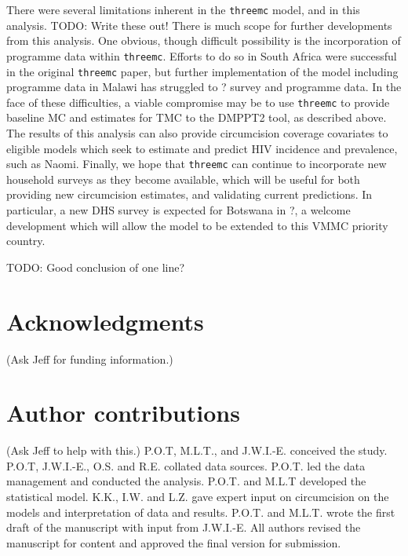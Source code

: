 \documentclass{article}
\begin{document}
There were several limitations inherent in the \verb|threemc| model, and in this analysis. 
TODO: Write these out!
There is much scope for further developments from this analysis. 
One obvious, though difficult possibility is the incorporation of programme data within \verb|threemc|. 
Efforts to do so in South Africa were successful in the original \verb|threemc| paper, but further implementation of the model including programme data in Malawi has struggled to ? survey and programme data. 
In the face of these difficulties, a viable compromise may be to use \verb|threemc| to provide baseline MC and estimates for TMC to the DMPPT2 tool, as described above. 
The results of this analysis can also provide circumcision coverage covariates to eligible models which seek to estimate and predict HIV incidence and prevalence, such as Naomi. 
Finally, we hope that \verb|threemc| can continue to incorporate new household surveys as they become available, which will be useful for both providing new circumcision estimates, and validating current predictions. 
In particular, a new DHS survey is expected for Botswana in ?, a welcome development which will allow the model to be extended to this VMMC priority country. 

TODO: Good conclusion of one line?



\section*{Acknowledgments}


{\color{red}(Ask Jeff for funding information.)}


\section*{Author contributions}


{\color{red}(Ask Jeff to help with this.)} P.O.T, M.L.T., and J.W.I.-E. conceived the study. P.O.T, J.W.I.-E., O.S. and R.E. collated data sources. P.O.T. led the data management and conducted the analysis. P.O.T. and M.L.T developed the statistical model. K.K., I.W. and L.Z. gave expert input on circumcision on the models and interpretation of data and results. P.O.T. and M.L.T. wrote the first draft of the manuscript with input from J.W.I.-E. All authors revised the manuscript for content and approved the final version for submission.
\end{document}
